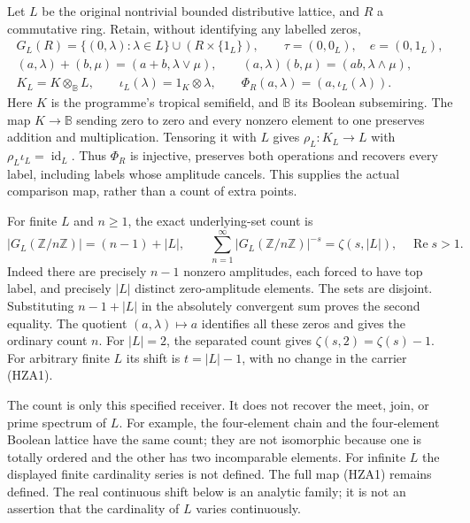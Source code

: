 \documentclass[11pt]{article}
\theoremstyle{definition}
\begin{document}
Let $L$ be the original nontrivial bounded distributive lattice, and $R$
a commutative ring. Retain, without identifying any labelled zeros,
\begin{equation}\tag{HZA1}
\begin{gathered}
G_L(R)=\{(0,\lambda):\lambda\in L\}\cup(R\times\{1_L\}),\qquad
\tau=(0,0_L),\quad e=(0,1_L),\\
(a,\lambda)+(b,\mu)=(a+b,\lambda\vee\mu),\qquad
(a,\lambda)(b,\mu)=(ab,\lambda\wedge\mu),\\
K_L=K\otimes_{\mathbb B}L,\qquad
\iota_L(\lambda)=1_K\otimes\lambda,\qquad
\Phi_R(a,\lambda)=(a,\iota_L(\lambda)).
\end{gathered}
\end{equation}
Here $K$ is the programme's tropical semifield, and $\mathbb B$ its
Boolean subsemiring. The map $K\to\mathbb B$ sending zero to zero and
every nonzero element to one preserves addition and multiplication.
Tensoring it with $L$ gives $\rho_L:K_L\to L$ with
$\rho_L\iota_L=\operatorname{id}_L$. Thus $\Phi_R$ is injective,
preserves both operations and recovers every label, including labels
whose amplitude cancels. This supplies the actual comparison map,
rather than a count of extra points.

For finite $L$ and $n\ge1$, the exact underlying-set count is
\begin{equation}\tag{HZA2}
\left|G_L(\mathbb Z/n\mathbb Z)\right|=(n-1)+|L|,
\qquad
\sum_{n=1}^{\infty}\left|G_L(\mathbb Z/n\mathbb Z)\right|^{-s}
=\zeta(s,|L|),\quad \operatorname{Re}s>1.
\end{equation}
Indeed there are precisely $n-1$ nonzero amplitudes, each forced to
have top label, and precisely $|L|$ distinct zero-amplitude elements.
The sets are disjoint. Substituting $n-1+|L|$ in the absolutely
convergent sum proves the second equality. The quotient
$(a,\lambda)\mapsto a$ identifies all these zeros and gives the
ordinary count $n$. For $|L|=2$, the separated count gives
$\zeta(s,2)=\zeta(s)-1$. For arbitrary finite $L$ its shift is
$t=|L|-1$, with no change in the carrier (HZA1).

The count is only this specified receiver. It does not recover the
meet, join, or prime spectrum of $L$. For example, the four-element
chain and the four-element Boolean lattice have the same count;
they are not isomorphic because one is totally ordered and the other
has two incomparable elements. For infinite $L$ the displayed finite
cardinality series is not defined. The full map (HZA1) remains
defined. The real continuous shift below is an analytic family;
it is not an assertion that the cardinality of $L$ varies continuously.
\end{document}
